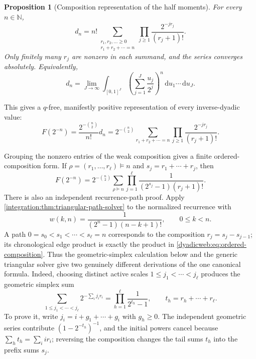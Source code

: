 \documentclass[11pt,oneside]{article}
\newtheorem{proposition}[proposition]{Proposition}
\theoremstyle{definition}
\theoremstyle{remark}
\newcommand{\N}{\mathbb N}
\newcommand{\dd}{\,\mathrm d}
\begin{document}
\begin{proposition}[Composition representation of the half moments]
\label{dyadicweb:prop:composition-d}
For every $n\in\N$,
\begin{equation}
 d_n=n!\!
 \sum_{\substack{r_1,r_2,\ldots\ge0\\r_1+r_2+\cdots=n}}
 \prod_{j\ge1}\frac{2^{-jr_j}}{(r_j+1)!}.                 \label{dyadicweb:eq:composition-d}
\end{equation}
Only finitely many $r_j$ are nonzero in each summand, and the series converges absolutely.
Equivalently,
\begin{equation}
 d_n=\lim_{J\to\infty}\int_{[0,1]^J}
       \left(\sum_{j=1}^{J}\frac{u_j}{2^j}\right)^n
       \dd u_1\cdots\dd u_J.                              \label{dyadicweb:eq:cube-d}
\end{equation}
\end{proposition}

This gives a $q$-free, manifestly positive representation of every inverse-dyadic value:
\begin{equation}
 F(2^{-n})=\frac{2^{-\binom n2}}{n!}d_n
 =2^{-\binom n2}
 \sum_{r_1+r_2+\cdots=n}
 \prod_{j\ge1}\frac{2^{-jr_j}}{(r_j+1)!}.                \label{dyadicweb:eq:inverse-composition}
\end{equation}

Grouping the nonzero entries of the weak composition gives a finite ordered-composition
form.  If $\rho=(r_1,\ldots,r_\ell)\vDash n$ and
$s_j=r_1+\cdots+r_j$, then
\begin{equation}
 \boxed{
 F(2^{-n})=2^{-\binom n2}
 \sum_{\rho\vDash n}\prod_{j=1}^{\ell}
 \frac1{(2^{s_j}-1)(r_j+1)!}.}
 \label{dyadicweb:eq:ordered-composition}
\end{equation}
There is also an independent recurrence-path proof.  Apply
\cref{integration:thm:triangular-path-solver} to the normalized recurrence with
\[
 w(k,n)=\frac1{(2^n-1)(n-k+1)!},\qquad 0\leq k<n.
\]
A path \(0=s_0<s_1<\cdots<s_\ell=n\) corresponds to the composition
\(r_j=s_j-s_{j-1}\); its chronological edge product is exactly the product in
\eqref{dyadicweb:eq:ordered-composition}.  Thus the geometric-simplex calculation below
and the generic triangular solver give two genuinely different derivations of the one
canonical formula.
Indeed, choosing distinct active scales $1\le j_1<\cdots<j_\ell$ produces the
geometric simplex sum
\begin{equation}
 \sum_{1\le j_1<\cdots<j_\ell}2^{-\sum_i j_ir_i}
 =\prod_{h=1}^{\ell}\frac1{2^{t_h}-1},\qquad
 t_h=r_h+\cdots+r_\ell.
 \label{dyadicweb:eq:geometric-simplex}
\end{equation}
To prove it, write $j_i=i+g_1+\cdots+g_i$ with $g_h\ge0$.  The independent
geometric series contribute $(1-2^{-t_h})^{-1}$, and the initial powers cancel
because $\sum_ht_h=\sum_iir_i$; reversing the composition changes the tail sums
$t_h$ into the prefix sums $s_j$.
\end{document}
